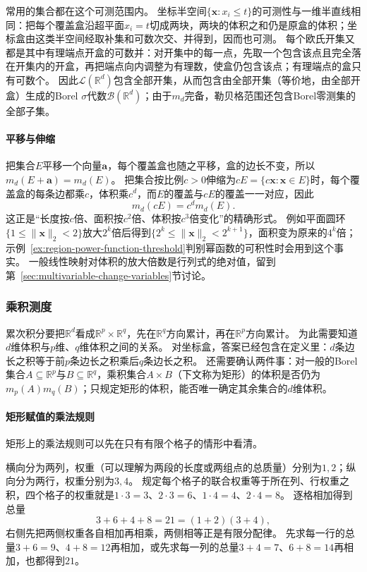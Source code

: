 常用的集合都在这个可测范围内。
坐标半空间$\{\bm x:x_i\leq t\}$的可测性与一维半直线相同：把每个覆盖盒沿超平面$x_i=t$切成两块，两块的体积之和仍是原盒的体积；坐标盒由这类半空间经取补集和可数次交、并得到，因而也可测。
每个欧氏开集又都是其中有理端点开盒的可数并：对开集中的每一点，先取一个包含该点且完全落在开集内的开盒，再把端点向内调整为有理数，使盒仍包含该点；有理端点的盒只有可数个。
因此$\mathcal L(\mathbb R^d)$包含全部开集，从而包含由全部开集（等价地，由全部开盒）生成的Borel $\sigma$代数$\mathcal B(\mathbb R^d)$；由于$m_d$完备，勒贝格范围还包含Borel零测集的全部子集。

\paragraph{平移与伸缩}

把集合$E$平移一个向量$\bm a$，每个覆盖盒也随之平移，盒的边长不变，所以$m_d(E+\bm a)=m_d(E)$。
把集合按比例$c>0$伸缩为$cE=\{c\bm x:\bm x\in E\}$时，每个覆盖盒的每条边都乘$c$，体积乘$c^d$，而$E$的覆盖与$cE$的覆盖一一对应，因此
\[
 m_d(cE)=c^dm_d(E).
\]
这正是“长度按$c$倍、面积按$c^2$倍、体积按$c^3$倍变化”的精确形式。
例如平面圆环$\{1\leq\lVert\bm x\rVert_2<2\}$放大$2^k$倍后得到$\{2^k\leq\lVert\bm x\rVert_2<2^{k+1}\}$，面积变为原来的$4^k$倍；示例~\ref{ex:region-power-function-threshold}判别幂函数的可积性时会用到这个事实。
一般线性映射对体积的放大倍数是行列式的绝对值，留到第~\ref{sec:multivariable-change-variables}节讨论。

\subsubsection{乘积测度}

累次积分要把$\mathbb R^d$看成$\mathbb R^p\times\mathbb R^q$，先在$\mathbb R^q$方向累计，再在$\mathbb R^p$方向累计。
为此需要知道$d$维体积与$p$维、$q$维体积之间的关系。
对坐标盒，答案已经包含在定义里：$d$条边长之积等于前$p$条边长之积乘后$q$条边长之积。
还需要确认两件事：对一般的Borel集合$A\subseteq\mathbb R^p$与$B\subseteq\mathbb R^q$，乘积集合$A\times B$（下文称为矩形）的体积是否仍为$m_p(A)m_q(B)$；只规定矩形的体积，能否唯一确定其余集合的$d$维体积。

\paragraph{矩形赋值的乘法规则}

矩形上的乘法规则可以先在只有有限个格子的情形中看清。
\begin{example}[有限网格上的乘积权重]
\label{ex:region-finite-product-weights}
横向分为两列，权重（可以理解为两段的长度或两组点的总质量）分别为$1,2$；纵向分为两行，权重分别为$3,4$。
规定每个格子的联合权重等于所在列、行权重之积，四个格子的权重就是$1\cdot3=3$、$2\cdot3=6$、$1\cdot4=4$、$2\cdot4=8$。
逐格相加得到总量
\[
 3+6+4+8=21=(1+2)(3+4),
\]
右侧先把两侧权重各自相加再相乘，两侧相等正是有限分配律。
先求每一行的总量$3+6=9$、$4+8=12$再相加，或先求每一列的总量$3+4=7$、$6+8=14$再相加，也都得到$21$。
\end{example}

